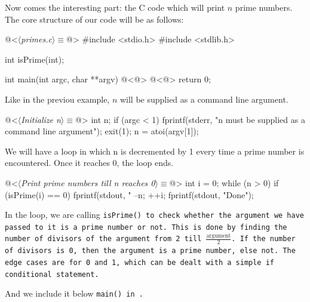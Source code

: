 Now comes the interesting part: the C code which will print $n$ prime numbers. The core structure of our code
will be as follows:

\begin{code}[primes.c]
@<$\langle$\textit{primes.c}$\rangle\equiv$@>
#include <stdio.h>
#include <stdlib.h>

int isPrime(int);

int main(int argc, char **argv)
{
    @<@>
    @<@>
    return 0;
}
\end{code}


Like in the previou example, $n$ will be supplied as a command line argument.

\begin{code}[Initialize n]
@<$\langle$\textit{Initialize n}$\rangle\equiv$@>
int n;
if (argc < 1) {
    fprintf(stderr, "n must be supplied as a command line argument\n");
    exit(1);
}
n = atoi(argv[1]);
\end{code}

We will have a loop in which n is decremented by 1 every time a prime number is encountered. Once it reaches
0, the loop ends.

\begin{code}
@<$\langle$\textit{Print prime numbers till n reaches 0}$\rangle\equiv$@>
int i = 0;
while (n > 0) {
    if (isPrime(i) == 0) {
        fprintf(stdout, "%
        --n;
    }
    ++i;
}
fprintf(stdout, "Done\n");
\end{code}

In the loop, we are calling \tt isPrime() \rm to check whether the argument we have passed to it is a prime
number or not. This is done by finding the number of divisors of the argument from 2 till
$\frac{\text{argument}}{2}$. If the number of divisors is 0, then the argument is a prime number, else not.
The edge cases are for 0 and 1, which can be dealt with a simple \tt if \rm conditional statement.


And we include it below \tt main() \rm in .

